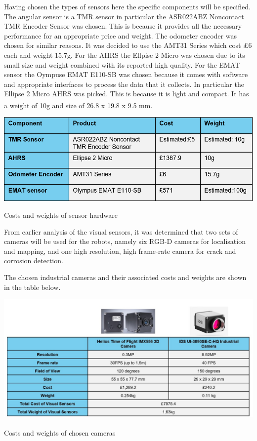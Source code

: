 \documentclass[11pt]{article}		%
\newcommand{\supercite}[1]{\textsuperscript{\cite{#1}}}		%
\begin{document}
	        Having chosen the types of sensors here the specific components will be specified. The angular sensor is a TMR sensor in particular the ASR022ABZ Noncontact TMR Encoder Sensor was chosen. This is because it provides all the necessary performance for an appropriate price and weight. The odometer encoder was chosen for similar reasons. It was decided to use the AMT31 Series which cost £6 each and weight 15.7g. For the AHRS the Ellpise 2 Micro was chosen due to its small size and weight combined with its reported high quality. For the EMAT sensor the Oympuse EMAT E110-SB was chosen because it comes with software and appropriate interfaces to process the data that it collects.
       		In particular the Ellipse 2 Micro AHRS was picked.
             This is because it is light and compact. It has a weight of 10g and size of 26.8 x 19.8 x 9.5 mm. \supercite{Ellipse_Ahrs}
       	  		\begin{table}[H]
       	  		
       	  		\centering
       	  		\includegraphics[scale=0.7]{smaller component sensor table}
       				\caption{Costs and weights of sensor hardware}
       				\label{sensorHardware}
       			\end{table}
       			
       			From earlier analysis of the visual sensors, it was determined that two sets of cameras will be used for the robots, namely six RGB-D cameras for localisation and mapping, and one high resolution, high frame-rate camera for crack and corrosion detection. 
       					
				The chosen industrial cameras and their associated costs and weights are shown in the table below.
				\begin{table}[H]
			  		
			  		\centering
			  		\includegraphics[width=\textwidth]{cameracosts.jpg}
						\caption{Costs and weights of chosen cameras\supercite{camera}\supercite{camera2}}
						\label{cameracost}
					\end{table}
	        
\end{document}
